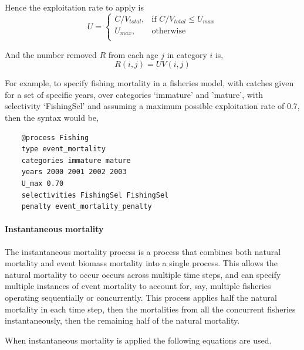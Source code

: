 Hence the exploitation rate to apply is 
\begin{equation}
U = \begin{cases}
  C/V_{total}, & \text{if $C/V_{total} \leq U_{max}$} \\
  U_{max}, & \text{otherwise}\\ 
  \end{cases} 
\end{equation}

And the number removed $R$ from each age $j$ in category $i$ is,
\begin{equation}
  R(i,j) = UV(i,j)
\end{equation}

For example, to specify fishing mortality in a fisheries model, with catches given for a set of specific years, over categories `immature' and 'mature', with selectivity `FishingSel' and assuming a maximum possible exploitation rate of 0.7, then the syntax would be,

{\small{\begin{verbatim}
	@process Fishing
	type event_mortality
	categories immature mature
	years 2000 2001 2002 2003
	U_max 0.70
	selectivities FishingSel FishingSel
	penalty event_mortality_penalty
	\end{verbatim}}}

\paragraph{Instantaneous mortality}

The instantaneous mortality process is a process that combines both natural mortality and event biomass mortality into a single process. This allows the natural mortality to occur occurs across multiple time steps, and can specify multiple instances of event mortality to account for, say, multiple fisheries operating sequentially or concurrently. This process applies half the natural mortality in each time step, then the mortalities from all the concurrent fisheries instantaneously, then the remaining half of the natural mortality.

When instantaneous mortality is applied the following equations are used.

